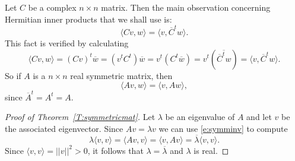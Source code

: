 \documentclass{ximera}
\begin{document}
Let $C$ be a complex $n\times n$ matrix.  Then the main observation
concerning Hermitian inner products that we shall use is:
\begin{equation} \label{e:hermite_matrix}
\langle Cv,w \rangle = \langle v,\overline{C}^tw \rangle.
\end{equation}
This fact is verified by calculating
\[
\langle Cv,w \rangle = (Cv)^t\overline{w} = (v^tC^t)\overline{w}
= v^t(C^t\overline{w}) = v^t(\overline{\overline{C}^tw})
= \langle v,\overline{C}^tw \rangle.
\]
So if $A$ is a $n\times n$ real symmetric matrix, then
\begin{equation}   \label{e:symminv}
\langle Av,w \rangle = \langle v,Aw \rangle,
\end{equation}
since $\overline{A}^t= A^t = A$.

\begin{proof}[Proof of Theorem~\ref{T:symmetricmat}]  Let $\lambda$
be an eigenvalue of $A$ and let $v$ be the associated eigenvector. Since
$Av=\lambda v$ we can use \eqref{e:symminv} to compute
\[
\lambda \langle v,v \rangle = \langle Av,v \rangle = \langle v,Av \rangle
= \overline{\lambda} \langle v,v \rangle.
\]
Since $\langle v,v \rangle = ||v||^2 > 0$, it follows that
$\lambda=\overline{\lambda}$ and $\lambda$ is real.  \end{proof}
\end{document}
